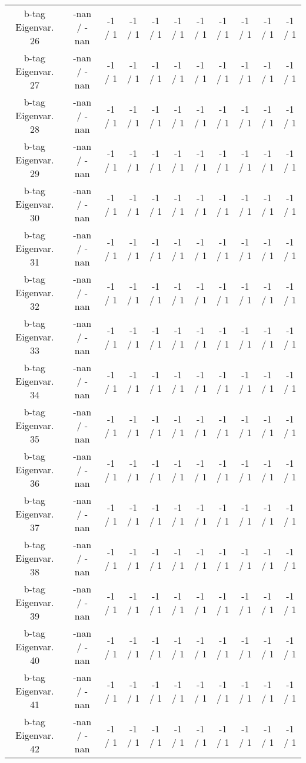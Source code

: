 \begin{table}[htbp]
\begin{center}
\begin{tabular}{|c|c|c|c|c|c|c|c|c|c|c|}
  b-tag Eigenvar. 26 & -nan / -nan & -1 / 1 & -1 / 1 & -1 / 1 & -1 / 1 & -1 / 1 & -1 / 1 & -1 / 1 & -1 / 1 & -1 / 1 \\ 
  b-tag Eigenvar. 27 & -nan / -nan & -1 / 1 & -1 / 1 & -1 / 1 & -1 / 1 & -1 / 1 & -1 / 1 & -1 / 1 & -1 / 1 & -1 / 1 \\ 
  b-tag Eigenvar. 28 & -nan / -nan & -1 / 1 & -1 / 1 & -1 / 1 & -1 / 1 & -1 / 1 & -1 / 1 & -1 / 1 & -1 / 1 & -1 / 1 \\ 
  b-tag Eigenvar. 29 & -nan / -nan & -1 / 1 & -1 / 1 & -1 / 1 & -1 / 1 & -1 / 1 & -1 / 1 & -1 / 1 & -1 / 1 & -1 / 1 \\ 
  b-tag Eigenvar. 30 & -nan / -nan & -1 / 1 & -1 / 1 & -1 / 1 & -1 / 1 & -1 / 1 & -1 / 1 & -1 / 1 & -1 / 1 & -1 / 1 \\ 
  b-tag Eigenvar. 31 & -nan / -nan & -1 / 1 & -1 / 1 & -1 / 1 & -1 / 1 & -1 / 1 & -1 / 1 & -1 / 1 & -1 / 1 & -1 / 1 \\ 
  b-tag Eigenvar. 32 & -nan / -nan & -1 / 1 & -1 / 1 & -1 / 1 & -1 / 1 & -1 / 1 & -1 / 1 & -1 / 1 & -1 / 1 & -1 / 1 \\ 
  b-tag Eigenvar. 33 & -nan / -nan & -1 / 1 & -1 / 1 & -1 / 1 & -1 / 1 & -1 / 1 & -1 / 1 & -1 / 1 & -1 / 1 & -1 / 1 \\ 
  b-tag Eigenvar. 34 & -nan / -nan & -1 / 1 & -1 / 1 & -1 / 1 & -1 / 1 & -1 / 1 & -1 / 1 & -1 / 1 & -1 / 1 & -1 / 1 \\ 
  b-tag Eigenvar. 35 & -nan / -nan & -1 / 1 & -1 / 1 & -1 / 1 & -1 / 1 & -1 / 1 & -1 / 1 & -1 / 1 & -1 / 1 & -1 / 1 \\ 
  b-tag Eigenvar. 36 & -nan / -nan & -1 / 1 & -1 / 1 & -1 / 1 & -1 / 1 & -1 / 1 & -1 / 1 & -1 / 1 & -1 / 1 & -1 / 1 \\ 
  b-tag Eigenvar. 37 & -nan / -nan & -1 / 1 & -1 / 1 & -1 / 1 & -1 / 1 & -1 / 1 & -1 / 1 & -1 / 1 & -1 / 1 & -1 / 1 \\ 
  b-tag Eigenvar. 38 & -nan / -nan & -1 / 1 & -1 / 1 & -1 / 1 & -1 / 1 & -1 / 1 & -1 / 1 & -1 / 1 & -1 / 1 & -1 / 1 \\ 
  b-tag Eigenvar. 39 & -nan / -nan & -1 / 1 & -1 / 1 & -1 / 1 & -1 / 1 & -1 / 1 & -1 / 1 & -1 / 1 & -1 / 1 & -1 / 1 \\ 
  b-tag Eigenvar. 40 & -nan / -nan & -1 / 1 & -1 / 1 & -1 / 1 & -1 / 1 & -1 / 1 & -1 / 1 & -1 / 1 & -1 / 1 & -1 / 1 \\ 
  b-tag Eigenvar. 41 & -nan / -nan & -1 / 1 & -1 / 1 & -1 / 1 & -1 / 1 & -1 / 1 & -1 / 1 & -1 / 1 & -1 / 1 & -1 / 1 \\ 
  b-tag Eigenvar. 42 & -nan / -nan & -1 / 1 & -1 / 1 & -1 / 1 & -1 / 1 & -1 / 1 & -1 / 1 & -1 / 1 & -1 / 1 & -1 / 1 \\ 

\end{tabular}
\end{center}
\end{table}
